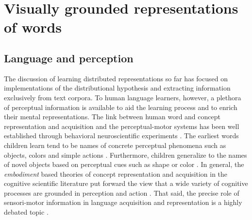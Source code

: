 



\section{Visually grounded representations of words}
\label{sec:visualwords}

\subsection{Language and perception}
\label{sec:langperc}

The discussion of learning distributed representations so far has focused on 
implementations of the distributional hypothesis and extracting information exclusively
from text corpora. To human language learners, however, a plethora of 
perceptual information is available to aid the
learning process and to enrich their mental representations. 
The link between human word and concept representation
and acquisition and the perceptual-motor systems has been well established through behavioral
neuroscientific experiments \citep{pulvermuller2005brain}.
The earliest words children learn tend to be names of concrete perceptual phenomena
such as objects, colors and simple actions \citep{bornstein2004cross}. Furthermore, children generalize to
the names of novel objects based on perceptual cues such as shape or color \citep{landau1998object}.
In general, the \emph{embodiment} based theories of concept representation and acquisition in the
cognitive scientific literature put forward the view that a wide variety of cognitive processes
are grounded in perception and action \citep{meteyard2008role}. That said, the precise role of
sensori-motor information in language acquisition and representation is a highly
debated topic \citep{meteyard2012coming}.

